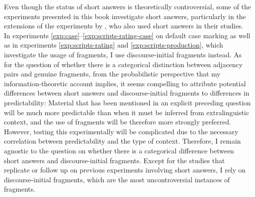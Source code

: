 Even though the status of short answers is theoretically controversial, some of the experiments presented in this book investigate short answers, particularly in the extensions of the experiments by \citet{merchant.etal2013}, who also used short answers in their studies. In experiments \ref{exp:case}--\ref{exp:scripts-rating-case} on default case marking as well as in experiments \ref{exp:scripts-rating} and \ref{exp:scripts-production}, which investigate the usage of fragments, I use discourse-initial fragments instead. As for the question of whether there is a categorical distinction between adjacency pairs and genuine fragments, from the probabilistic perspective that my information-theoretic account implies, it seems compelling to attribute potential differences between short answers and discourse-initial fragments to differences in predictability: Material that has been mentioned in an explicit preceding question will be much more predictable than when it must be inferred from extralinguistic context, and the use of fragments will be therefore more strongly preferred. However, testing this experimentally will be complicated due to the necessary correlation between predictability and the type of context. Therefore, I remain agnostic to the question on whether there is a categorical difference between short answers and discourse-initial fragments. Except for the studies that replicate or follow up on previous experiments involving short answers, I rely on discourse-initial fragments, which are the most uncontroversial instances of fragments.
